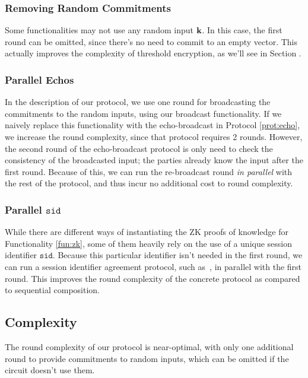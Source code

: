 \subsubsection{Removing Random Commitments}

Some functionalities may not use any random input $\textbf{k}$.
In this case, the first round can be omitted, since there's
no need to commit to an empty vector.
This actually improves the complexity of threshold encryption,
as we'll see in Section .

\subsubsection{Parallel Echos}

In the description of our protocol, we use one round for broadcasting
the commitments to the random inputs, using our broadcast functionality.
If we naively replace this functionality with the
echo-broadcast in Protocol \ref{prot:echo},
we increase the round complexity, since that protocol requires 2 rounds.
However, the second round of the echo-broadcast protocol is only
need to check the consistency of the broadcasted input; the parties
already know the input after the first round.
Because of this, we can run the re-broadcast round \emph{in parallel}
with the rest of the protocol, and thus incur no additional
cost to round complexity. 

\subsubsection{Parallel $\texttt{sid}$}

While there are different ways of instantiating the ZK proofs
of knowledge for Functionality \ref{fun:zk}, some of them
heavily rely on the use of a unique session identifier $\texttt{sid}$.
Because this particular identifier isn't needed in the first round,
we can run a session identifier agreement protocol,
such as~\cite{barak_protocol_2004}, in parallel with the first round.
This improves the round complexity of the concrete protocol as
compared to sequential composition.

\subsection{Complexity}

The round complexity of our protocol is near-optimal, with
only one additional round to provide commitments to random inputs,
which can be omitted if the circuit doesn't use them.

